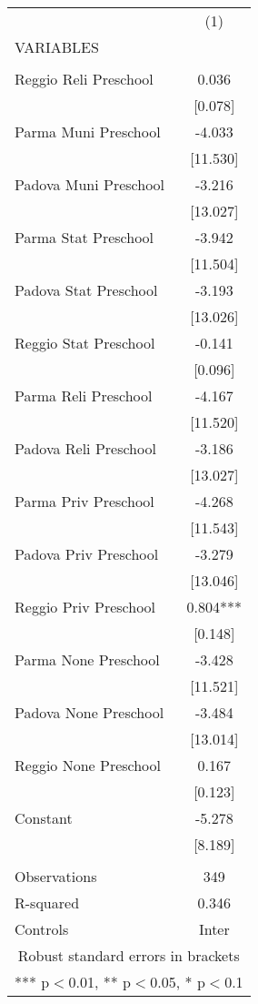 \begin{tabular}{lc} \hline
 & (1) \\
VARIABLES &  \\ \hline
 &  \\
Reggio Reli Preschool & 0.036 \\
 & [0.078] \\
Parma Muni Preschool & -4.033 \\
 & [11.530] \\
Padova Muni Preschool & -3.216 \\
 & [13.027] \\
Parma Stat Preschool & -3.942 \\
 & [11.504] \\
Padova Stat Preschool & -3.193 \\
 & [13.026] \\
Reggio Stat Preschool & -0.141 \\
 & [0.096] \\
Parma Reli Preschool & -4.167 \\
 & [11.520] \\
Padova Reli Preschool & -3.186 \\
 & [13.027] \\
Parma Priv Preschool & -4.268 \\
 & [11.543] \\
Padova Priv Preschool & -3.279 \\
 & [13.046] \\
Reggio Priv Preschool & 0.804*** \\
 & [0.148] \\
Parma None Preschool & -3.428 \\
 & [11.521] \\
Padova None Preschool & -3.484 \\
 & [13.014] \\
Reggio None Preschool & 0.167 \\
 & [0.123] \\
Constant & -5.278 \\
 & [8.189] \\
 &  \\
Observations & 349 \\
R-squared & 0.346 \\
 Controls & Inter \\ \hline
\multicolumn{2}{c}{ Robust standard errors in brackets} \\
\multicolumn{2}{c}{ *** p$<$0.01, ** p$<$0.05, * p$<$0.1} \\
\end{tabular}
